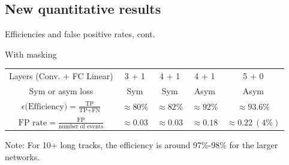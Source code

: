 \subsection {New quantitative results}
\begin{frame}{Efficiencies and false positive rates, cont.}
\begin{table}[]
\centering
    {\Large With masking} \\
    \vspace{.5em}
\begin{tabular}{ccccc}
    Layers (Conv. + FC Linear) & 3 + 1 & 4 + 1 & 4 + 1  & 5 + 0\\[.3em]
    Sym or asym loss      & Sym          & Sym             & Asym & Asym     \\ [0.9em]
    $ \epsilon \textrm{(Efficiency)} = \frac{\mbox{TP}}{\mbox{TP} + \mbox{FN}} $ &  $ \approx 80\% $  & $ \approx 82\% $ & $ \approx 92\% $ & $ \approx 93.6\% $ \\ [0.9em]
    $ \textrm{FP rate} = \frac{\mbox{FP}}{\mbox{number of events}} $ &  $\approx 0.03  $  & $\approx 0.03  $ & $ \approx 0.18 $ & $ \approx 0.22\ (4\%) $ \\
 \end{tabular}
\end{table}

Note: For 10+ long tracks, the efficiency is around 97\%-98\% for the larger networks.
\end{frame}

